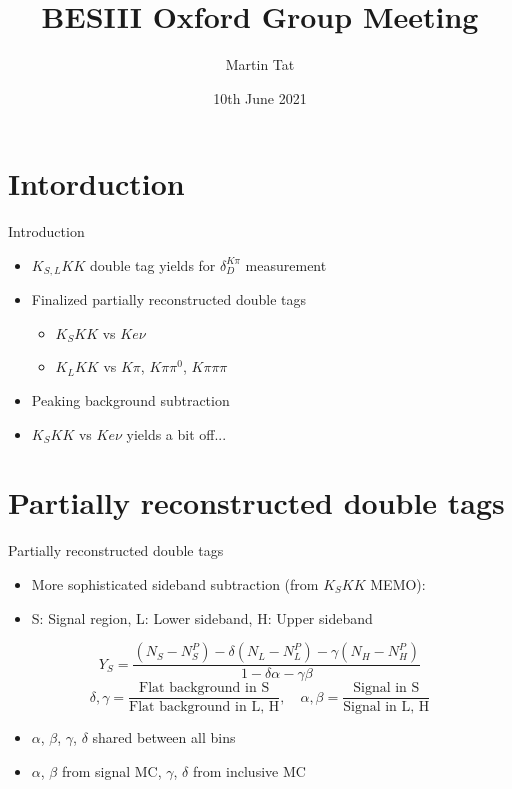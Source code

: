 \documentclass{beamer}
\title[BESIII Oxford]{BESIII Oxford Group Meeting}
\author{Martin Tat}
\institute{Oxford LHCb}
\date{10th June 2021}
\begin{document}
\begin{frame}
  \titlepage
\end{frame}


\section{Intorduction}
\begin{frame}{Introduction}
  \begin{itemize}
    \setlength\itemsep{2em}
    \item{$K_{S, L}KK$ double tag yields for $\delta_D^{K\pi}$ measurement}
    \item{Finalized partially reconstructed double tags}
    \begin{itemize}
      \item{$K_SKK$ vs $Ke\nu$}
      \item{$K_LKK$ vs $K\pi$, $K\pi\pi^0$, $K\pi\pi\pi$}
    \end{itemize}
    \item{Peaking background subtraction}
    \item{$K_SKK$ vs $Ke\nu$ yields a bit off...}
  \end{itemize}
\end{frame}

\section{Partially reconstructed double tags}
\begin{frame}{Partially reconstructed double tags}
  \begin{itemize}
    \setlength\itemsep{1em}
    \item{More sophisticated sideband subtraction (from $K_SKK$ MEMO):}
    \item{S: Signal region, L: Lower sideband, H: Upper sideband}
  \end{itemize}
  \begin{equation*}
    Y_S = \frac{(N_S - N_S^P) - \delta(N_L - N_L^P) - \gamma(N_H - N_H^P)}{1 - \delta\alpha - \gamma\beta}
  \end{equation*}
  \begin{equation*}
    \delta, \gamma = \frac{\text{Flat background in S}}{\text{Flat background in L, H}}, \quad \alpha, \beta = \frac{\text{Signal in S}}{\text{Signal in L, H}}
  \end{equation*}
  \begin{itemize}
    \item{$\alpha$, $\beta$, $\gamma$, $\delta$ shared between all bins}
    \item{$\alpha$, $\beta$ from signal MC, $\gamma$, $\delta$ from inclusive MC}
  \end{itemize}
\end{frame}
\end{document}

